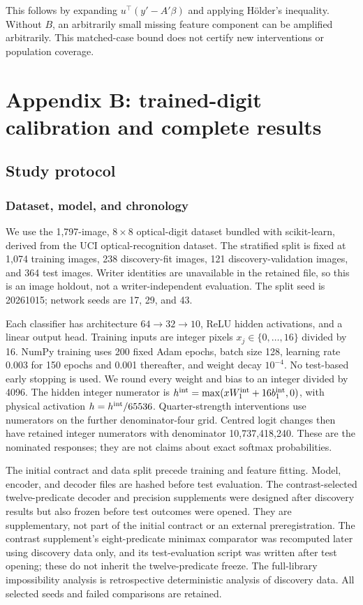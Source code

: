 \documentclass[
  british,
  11pt,
  a4paper,
]{article}
\begin{document}
This follows by expanding \(u^\top(y'-A'\beta)\) and applying Hölder's
inequality. Without \(B\), an arbitrarily small missing feature
component can be amplified arbitrarily. This matched-case bound does not
certify new interventions or population coverage.

\section{Appendix B: trained-digit calibration and complete
results}\label{appendix-b-trained-digit-calibration-and-complete-results}

\subsection{Study protocol}\label{study-protocol}

\subsubsection{Dataset, model, and
chronology}\label{dataset-model-and-chronology}

We use the 1,797-image, \(8\times8\) optical-digit dataset bundled with
scikit-learn, derived from the UCI optical-recognition dataset. The
stratified split is fixed at 1,074 training images, 238 discovery-fit
images, 121 discovery-validation images, and 364 test images. Writer
identities are unavailable in the retained file, so this is an image
holdout, not a writer-independent evaluation. The split seed is
20261015; network seeds are 17, 29, and 43.

Each classifier has architecture \(64\to32\to10\), ReLU hidden
activations, and a linear output head. Training inputs are integer
pixels \(x_j\in\{0,\ldots,16\}\) divided by 16. NumPy training uses 200
fixed Adam epochs, batch size 128, learning rate 0.003 for 150 epochs
and 0.001 thereafter, and weight decay \(10^{-4}\). No test-based early
stopping is used. We round every weight and bias to an integer divided
by 4096. The hidden integer numerator is
\(h^{\rm int}=\max(xW_1^{\rm int}+16b_1^{\rm int},0)\), with physical
activation \(h=h^{\rm int}/65536\). Quarter-strength interventions use
numerators on the further denominator-four grid. Centred logit changes
then have retained integer numerators with denominator 10,737,418,240.
These are the nominated responses; they are not claims about exact
softmax probabilities.

The initial contract and data split precede training and feature
fitting. Model, encoder, and decoder files are hashed before test
evaluation. The contrast-selected twelve-predicate decoder and precision
supplements were designed after discovery results but also frozen before
test outcomes were opened. They are supplementary, not part of the
initial contract or an external preregistration. The contrast
supplement's eight-predicate minimax comparator was recomputed later
using discovery data only, and its test-evaluation script was written
after test opening; these do not inherit the twelve-predicate freeze.
The full-library impossibility analysis is retrospective deterministic
analysis of discovery data. All selected seeds and failed comparisons
are retained.
\end{document}
